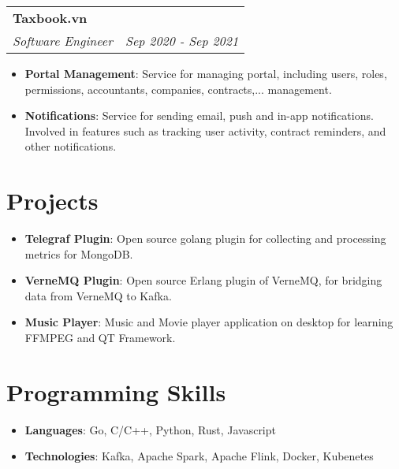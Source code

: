 \documentclass[letterpaper,11pt]{article}
\makeatletter
\newcommand{\resumeItem}[2]{
  \item\small{
    \textbf{#1}{: #2 \vspace{-2pt}}
  }
}
\newcommand{\resumeSubheading}[4]{
  \vspace{-1pt}\item
    \begin{tabular*}{0.97\textwidth}[t]{l@{\extracolsep{\fill}}r}
      \textbf{#1} & #2 \\
      \textit{\small#3} & \textit{\small #4} \\
    \end{tabular*}\vspace{-5pt}
}
\newcommand{\resumeSubItem}[2]{\resumeItem{#1}{#2}\vspace{-4pt}}
\newcommand{\resumeSubHeadingListStart}{\begin{itemize}[leftmargin=*]}
\newcommand{\resumeSubHeadingListEnd}{\end{itemize}}
\newcommand{\resumeItemListStart}{\begin{itemize}}
\newcommand{\resumeItemListEnd}{\end{itemize}\vspace{-5pt}}
\makeatother
\begin{document}

    \resumeSubheading
    {Taxbook.vn}{}
    {Software Engineer}{Sep 2020 - Sep 2021}
    \resumeItemListStart
      \resumeItem{Portal Management}
        {Service for managing portal, including users, roles, permissions, accountants, companies, contracts,... management.}
      \resumeItem{Notifications}
        {Service for sending email, push and in-app notifications. Involved in features such as tracking user activity, contract reminders, and other notifications.}
    \resumeItemListEnd



\section{Projects}
  \resumeSubHeadingListStart
    \resumeSubItem{Telegraf Plugin}
      {Open source golang plugin for collecting and processing metrics for MongoDB.}
    \resumeSubItem{VerneMQ Plugin}
      {Open source Erlang plugin of VerneMQ, for bridging data from VerneMQ to Kafka.}
    \resumeSubItem{Music Player}
      {Music and Movie player application on desktop for learning FFMPEG and QT Framework.}
  \resumeSubHeadingListEnd

%
\section{Programming Skills}
 \resumeSubHeadingListStart
   \item{
     \textbf{Languages}{: Go, C/C++, Python, Rust, Javascript}
     \hfill
   }
   \item{
    \textbf{Technologies}{: Kafka, Apache Spark, Apache Flink, Docker, Kubenetes}
   }
 \resumeSubHeadingListEnd


\end{document}

